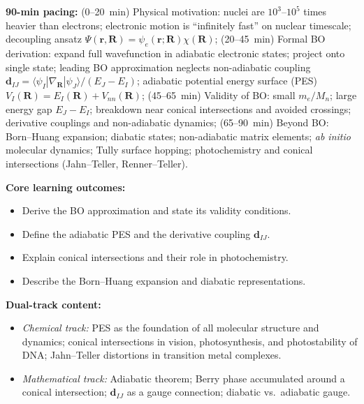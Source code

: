\documentclass[11pt,a4paper]{article}
\begin{document}
\begin{tcolorbox}[chembox, title={Module~III.1 --- Lecture L02: Born--Oppenheimer Approximation and Adiabaticity}]
\textbf{90-min pacing:} (0--20~min) Physical motivation: nuclei are $10^3$--$10^5$ times heavier than electrons; electronic motion is ``infinitely fast'' on nuclear timescale; decoupling ansatz $\Psi(\mathbf{r},\mathbf{R})=\psi_e(\mathbf{r};\mathbf{R})\chi(\mathbf{R})$; (20--45~min) Formal BO derivation: expand full wavefunction in adiabatic electronic states; project onto single state; leading BO approximation neglects non-adiabatic coupling $\mathbf{d}_{IJ}=\langle\psi_I|\nabla_\mathbf{R}|\psi_J\rangle/({E_J-E_I})$; adiabatic potential energy surface (PES) $V_I(\mathbf{R})=E_I(\mathbf{R})+V_{nn}(\mathbf{R})$; (45--65~min) Validity of BO: small $m_e/M_n$; large energy gap $E_J-E_I$; breakdown near conical intersections and avoided crossings; derivative couplings and non-adiabatic dynamics; (65--90~min) Beyond BO: Born--Huang expansion; diabatic states; non-adiabatic matrix elements; \emph{ab initio} molecular dynamics; Tully surface hopping; photochemistry and conical intersections (Jahn--Teller, Renner--Teller).

\medskip\textbf{Core learning outcomes:}
\begin{itemize}[leftmargin=1.4em,topsep=2pt,itemsep=1pt]
  \item Derive the BO approximation and state its validity conditions.
  \item Define the adiabatic PES and the derivative coupling $\mathbf{d}_{IJ}$.
  \item Explain conical intersections and their role in photochemistry.
  \item Describe the Born--Huang expansion and diabatic representations.
\end{itemize}

\medskip\textbf{Dual-track content:}
\begin{itemize}[leftmargin=1.4em,topsep=2pt,itemsep=1pt]
  \item \textit{Chemical track:} PES as the foundation of all molecular structure and dynamics; conical intersections in vision, photosynthesis, and photostability of DNA; Jahn--Teller distortions in transition metal complexes.
  \item \textit{Mathematical track:} Adiabatic theorem; Berry phase accumulated around a conical intersection; $\mathbf{d}_{IJ}$ as a gauge connection; diabatic vs.\ adiabatic gauge.
\end{itemize}


\end{tcolorbox}
\end{document}
